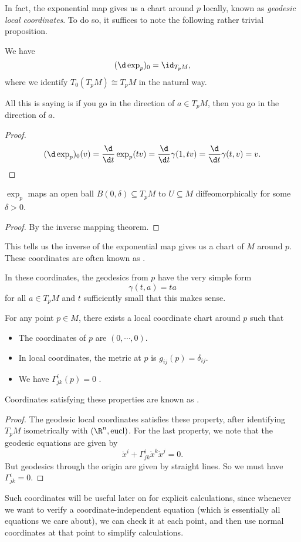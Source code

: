 \documentclass[a4paper]{article}
\begin{document}
In fact, the exponential map gives us a chart around $p$ locally, known as \emph{geodesic local coordinates}. To do so, it suffices to note the following rather trivial proposition.

\begin{prop}
  We have
  \[
    (\d \exp_p)_0 = \id _{T_p M},
  \]
  where we identify $T_0 (T_p M) \cong T_p M$ in the natural way.
\end{prop}
All this is saying is if you go in the direction of $a \in T_p M$, then you go in the direction of $a$.

\begin{proof}
   \[
     (\d \exp_p)_0(v) = \frac{\d}{\d t} \exp_p(tv) = \frac{\d}{\d t} \gamma(1, tv) = \frac{\d}{\d t} \gamma(t, v) = v.\qedhere
   \]
\end{proof}

\begin{cor}
  $\exp_p$ maps an open ball $B(0, \delta) \subseteq T_p M$ to $U \subseteq M$ diffeomorphically for some $\delta > 0$.
\end{cor}

\begin{proof}
  By the inverse mapping theorem.
\end{proof}

This tells us the inverse of the exponential map gives us a chart of $M$ around $p$. These coordinates are often known as .

In these coordinates, the geodesics from $p$ have the very simple form
\[
  \gamma(t, a) = ta
\]
for all $a \in T_p M$ and $t$ sufficiently small that this makes sense.

\begin{cor}
  For any point $p \in M$, there exists a local coordinate chart around $p$ such that
  \begin{itemize}
    \item The coordinates of $p$ are $(0, \cdots, 0)$.
    \item In local coordinates, the metric at $p$ is $g_{ij}(p) = \delta_{ij}$.
    \item We have $\Gamma^i_{jk}(p) = 0$ .
  \end{itemize}
\end{cor}
Coordinates satisfying these properties are known as .
\begin{proof}
  The geodesic local coordinates satisfies these property, after identifying $T_p M$ isometrically with $(\R^n, \mathrm{eucl})$. For the last property, we note that the geodesic equations are given by
  \[
    \ddot{x}^i + \Gamma^i_{jk}\dot{x}^k \dot{x}^j = 0.
  \]
  But geodesics through the origin are given by straight lines. So we must have $\Gamma^i_{jk} = 0$.
\end{proof}
Such coordinates will be useful later on for explicit calculations, since whenever we want to verify a coordinate-independent equation (which is essentially all equations we care about), we can check it at each point, and then use normal coordinates at that point to simplify calculations.
\end{document}
